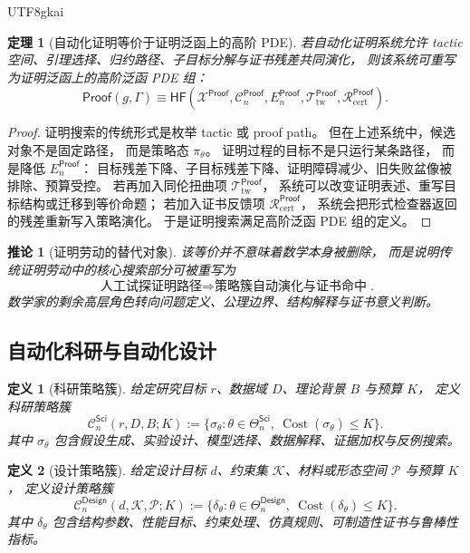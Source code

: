 \documentclass[12pt]{article}
\newtheorem{definition}{定义}[section]
\newtheorem{theorem}{定理}[section]
\newtheorem{corollary}{推论}[section]
\newcommand{\ProofAuto}{\mathsf{Proof}}
\newcommand{\SciAuto}{\mathsf{Sci}}
\newcommand{\DesignAuto}{\mathsf{Design}}
\newcommand{\HF}{\mathsf{HF}}
\newcommand{\Cost}{\operatorname{Cost}}
\begin{document}
\begin{CJK*}{UTF8}{gkai}
\begin{theorem}[自动化证明等价于证明泛函上的高阶 PDE]
\label{thm:tex53-proof-hf}
若自动化证明系统允许 tactic 空间、引理选择、归约路径、子目标分解与证书残差共同演化，
则该系统可重写为证明泛函上的高阶泛函 PDE 组：
\[
  \ProofAuto(g,\Gamma)
  \equiv
  \HF(
    \mathcal X^{\ProofAuto},
    \mathcal C^{\ProofAuto}_n,
    E^{\ProofAuto}_n,
    \mathcal T^{\ProofAuto}_{\mathrm{tw}},
    \mathcal R^{\ProofAuto}_{\mathrm{cert}}
  ).
\]
\end{theorem}

\begin{proof}
证明搜索的传统形式是枚举 tactic 或 proof path。
但在上述系统中，候选对象不是固定路径，
而是策略态 \(\pi_\theta\)。
证明过程的目标不是只运行某条路径，
而是降低 \(E^{\ProofAuto}_n\)：
目标残差下降、子目标残差下降、证明障碍减少、旧失败盆像被排除、预算受控。
若再加入同伦扭曲项 \(\mathcal T^{\ProofAuto}_{\mathrm{tw}}\)，
系统可以改变证明表述、重写目标结构或迁移到等价命题；
若加入证书反馈项 \(\mathcal R^{\ProofAuto}_{\mathrm{cert}}\)，
系统会把形式检查器返回的残差重新写入策略演化。
于是证明搜索满足高阶泛函 PDE 组的定义。
\end{proof}

\begin{corollary}[证明劳动的替代对象]
该等价并不意味着数学本身被删除，
而是说明传统证明劳动中的核心搜索部分可被重写为
\[
  \boxed{
    \text{人工试探证明路径}
    \Longrightarrow
    \text{策略簇自动演化与证书命中}
  }.
\]
数学家的剩余高层角色转向问题定义、公理边界、结构解释与证书意义判断。
\end{corollary}

\subsection{自动化科研与自动化设计}
\label{subsec:tex53-science-design}

\begin{definition}[科研策略簇]
给定研究目标 \(r\)、数据域 \(D\)、理论背景 \(B\) 与预算 \(K\)，
定义科研策略簇
\[
  \mathcal C^{\SciAuto}_n(r,D,B;K)
  :=
  \{
    \sigma_\theta:
    \theta\in\Theta^{\SciAuto}_n,\ 
    \Cost(\sigma_\theta)\le K
  \}.
\]
其中 \(\sigma_\theta\) 包含假设生成、实验设计、模型选择、数据解释、证据加权与反例搜索。
\end{definition}

\begin{definition}[设计策略簇]
给定设计目标 \(d\)、约束集 \(\mathcal K\)、材料或形态空间 \(\mathcal P\) 与预算 \(K\)，
定义设计策略簇
\[
  \mathcal C^{\DesignAuto}_n(d,\mathcal K,\mathcal P;K)
  :=
  \{
    \delta_\theta:
    \theta\in\Theta^{\DesignAuto}_n,\ 
    \Cost(\delta_\theta)\le K
  \}.
\]
其中 \(\delta_\theta\) 包含结构参数、性能目标、约束处理、仿真规则、可制造性证书与鲁棒性指标。
\end{definition}


\end{CJK*}
\end{document}
